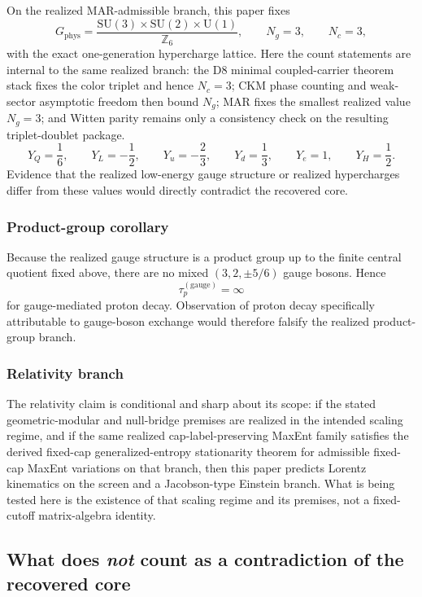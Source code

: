\documentclass[11pt]{article}
\newcommand{\SU}{\mathrm{SU}}
\newcommand{\U}{\mathrm{U}}
\begin{document}
On the realized MAR-admissible branch, this paper fixes
\[
G_{\mathrm{phys}}=
\frac{\SU(3)\times\SU(2)\times\U(1)}{\mathbb Z_6},
\qquad
N_g=3,
\qquad
N_c=3,
\]
with the exact one-generation hypercharge lattice. Here the count statements are internal to the same realized branch: the D8 minimal coupled-carrier theorem stack fixes the color triplet and hence \(N_c=3\); CKM phase counting and weak-sector asymptotic freedom then bound \(N_g\); MAR fixes the smallest realized value \(N_g=3\); and Witten parity remains only a consistency check on the resulting triplet-doublet package.
\[
Y_Q=\frac16,\qquad
Y_L=-\frac12,\qquad
Y_u=-\frac23,\qquad
Y_d=\frac13,\qquad
Y_e=1,\qquad
Y_H=\frac12.
\]
Evidence that the realized low-energy gauge structure or realized hypercharges differ from these values would directly contradict the recovered core.

\subsubsection{Product-group corollary}

Because the realized gauge structure is a product group up to the finite central quotient fixed above, there are no mixed \((3,2,\pm 5/6)\) gauge bosons. Hence
\[
\tau_p^{(\mathrm{gauge})}=\infty
\]
for gauge-mediated proton decay. Observation of proton decay specifically attributable to gauge-boson exchange would therefore falsify the realized product-group branch.

\subsubsection{Relativity branch}

The relativity claim is conditional and sharp about its scope: if the stated geometric-modular and null-bridge premises are realized in the intended scaling regime, and if the same realized cap-label-preserving MaxEnt family satisfies the derived fixed-cap generalized-entropy stationarity theorem for admissible fixed-cap MaxEnt variations on that branch, then this paper predicts Lorentz kinematics on the screen and a Jacobson-type Einstein branch. What is being tested here is the existence of that scaling regime and its premises, not a fixed-cutoff matrix-algebra identity.

\subsection{What does \emph{not} count as a contradiction of the recovered core}
\end{document}
